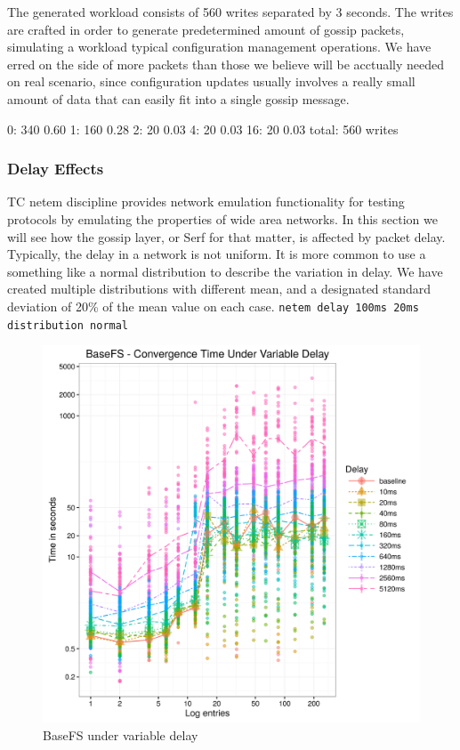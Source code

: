 \documentclass{sig-alternate}
\begin{document}
The generated workload consists of 560 writes separated by 3 seconds. The writes are crafted in order to generate predetermined amount of gossip packets, simulating a workload typical configuration management operations. We have erred on the side of more packets than those we believe will be acctually needed on real scenario, since configuration updates usually involves a really small amount of data that can easily fit into a single gossip message.

0: 340 0.60 1: 160 0.28 2: 20 0.03 4: 20 0.03 16: 20 0.03 total: 560 writes


\subsubsection{Delay Effects}

TC netem discipline provides network emulation functionality for testing protocols by emulating the properties of wide area networks. In this section we will see how the gossip layer, or Serf for that matter, is affected by packet delay. Typically, the delay in a network is not uniform. It is more common to use a something like a normal distribution to describe the variation in delay. We have created multiple distributions with different mean, and a designated standard deviation of 20\% of the mean value on each case. \texttt{netem delay 100ms 20ms distribution normal}


\begin{figure}[htp]
\centering
\includegraphics[width=\columnwidth]{../eval/plots/basefs-delay.png}
\caption{BaseFS under variable delay}
\label{fig:basefs-delay}
\end{figure}
\end{document}
